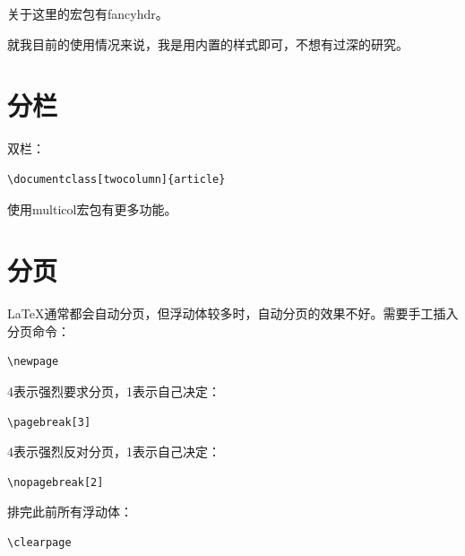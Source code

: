 \documentclass[UTF8]{article}
\begin{document}
关于这里的宏包有fancyhdr。

就我目前的使用情况来说，我是用内置的样式即可，不想有过深的研究。

\section{分栏}
双栏：
\begin{lstlisting}
\documentclass[twocolumn]{article}
\end{lstlisting}

使用multicol宏包有更多功能。

\section{分页}
\LaTeX 通常都会自动分页，但浮动体较多时，自动分页的效果不好。需要手工插入分页命令：
\begin{lstlisting}
\newpage
\end{lstlisting}

4表示强烈要求分页，1表示自己决定：
\begin{lstlisting}
\pagebreak[3]
\end{lstlisting}

4表示强烈反对分页，1表示自己决定：
\begin{lstlisting}
\nopagebreak[2]
\end{lstlisting}

排完此前所有浮动体：
\begin{lstlisting}
\clearpage
\end{lstlisting}
\end{document}
